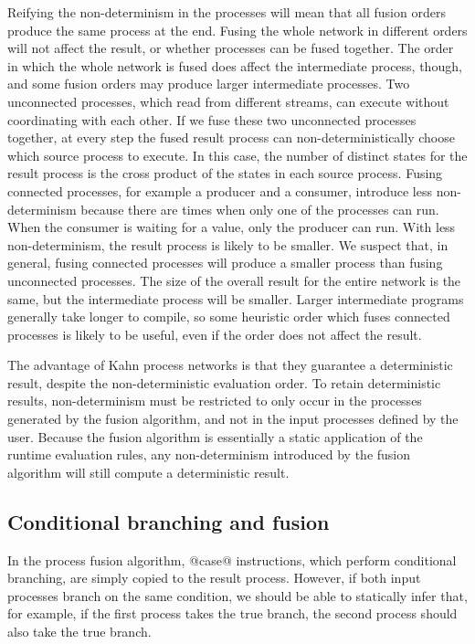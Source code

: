 Reifying the non-determinism in the processes will mean that all fusion orders produce the same process at the end.
Fusing the whole network in different orders will not affect the result, or whether processes can be fused together.
The order in which the whole network is fused does affect the intermediate process, though, and some fusion orders may produce larger intermediate processes.
Two unconnected processes, which read from different streams, can execute without coordinating with each other.
If we fuse these two unconnected processes together, at every step the fused result process can non-deterministically choose which source process to execute.
In this case, the number of distinct states for the result process is the cross product of the states in each source process.
Fusing connected processes, for example a producer and a consumer, introduce less non-determinism because there are times when only one of the processes can run.
When the consumer is waiting for a value, only the producer can run.
With less non-determinism, the result process is likely to be smaller.
We suspect that, in general, fusing connected processes will produce a smaller process than fusing unconnected processes.
The size of the overall result for the entire network is the same, but the intermediate process will be smaller.
Larger intermediate programs generally take longer to compile, so some heuristic order which fuses connected processes is likely to be useful, even if the order does not affect the result.

The advantage of Kahn process networks is that they guarantee a deterministic result, despite the non-deterministic evaluation order.
To retain deterministic results, non-determinism must be restricted to only occur in the processes generated by the fusion algorithm, and not in the input processes defined by the user.
Because the fusion algorithm is essentially a static application of the runtime evaluation rules, any non-determinism introduced by the fusion algorithm will still compute a deterministic result.

\subsection{Conditional branching and fusion}
In the process fusion algorithm, @case@ instructions, which perform conditional branching, are simply copied to the result process.
However, if both input processes branch on the same condition, we should be able to statically infer that, for example, if the first process takes the true branch, the second process should also take the true branch.

